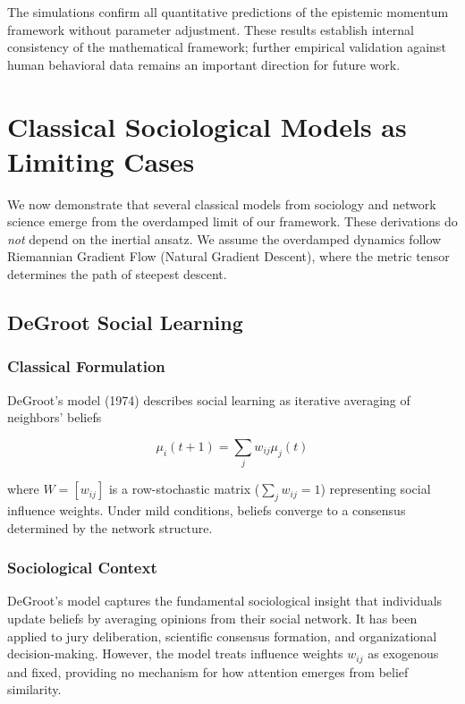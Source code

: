 \documentclass[12pt]{article}
\begin{document}
The simulations confirm all quantitative predictions of the epistemic momentum framework without parameter adjustment. These results establish internal consistency of the mathematical framework; further empirical validation against human behavioral data remains an important direction for future work.

\section{Classical Sociological Models as Limiting Cases}
\label{sec:classical_limits}

We now demonstrate that several classical models from sociology and network science emerge from the overdamped limit of our framework. These derivations do \emph{not} depend on the inertial ansatz. We assume the overdamped dynamics follow Riemannian Gradient Flow (Natural Gradient Descent), where the metric tensor determines the path of steepest descent. 

\subsection{DeGroot Social Learning}

\subsubsection{Classical Formulation}

DeGroot's model (1974) describes social learning as iterative averaging of neighbors' beliefs

\begin{equation}
\mu_i(t+1) = \sum_j w_{ij} \mu_j(t)
\label{eq:degroot_classical}
\end{equation}

where $W = [w_{ij}]$ is a row-stochastic matrix ($\sum_j w_{ij} = 1$) representing social influence weights. Under mild conditions, beliefs converge to a consensus determined by the network structure.

\subsubsection{Sociological Context}

DeGroot's model captures the fundamental sociological insight that individuals update beliefs by averaging opinions from their social network. It has been applied to jury deliberation, scientific consensus formation, and organizational decision-making. However, the model treats influence weights $w_{ij}$ as exogenous and fixed, providing no mechanism for how attention emerges from belief similarity.
\end{document}
